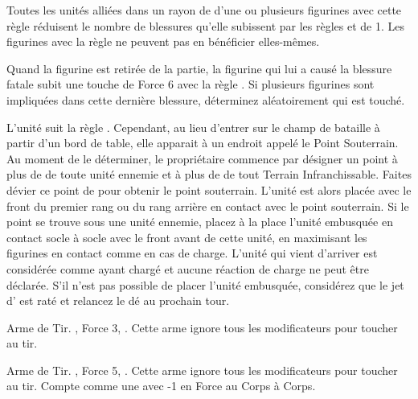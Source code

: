 Toutes les unités alliées dans un rayon de  d'une ou plusieurs figurines avec cette règle réduisent le nombre de blessures qu'elle subissent par les règles \dusttodust{} et \unstable{} de 1. Les figurines avec la règle \necromanticaura{} ne peuvent pas en bénéficier elles-mêmes.

\armyspecialruleentry{\mummyscurse{}}

Quand la figurine est retirée de la partie, la figurine qui lui a causé la blessure fatale subit une touche de Force 6 avec la règle . Si plusieurs figurines sont impliquées dans cette dernière blessure, déterminez aléatoirement qui est touché.

\armyspecialruleentry{\undergroundambush{}}

L'unité suit la règle \ambush{}. Cependant, au lieu d'entrer sur le champ de bataille à partir d'un bord de table, elle apparait à un endroit appelé le Point Souterrain. Au moment de le déterminer, le propriétaire commence par désigner un point à plus de  de toute unité ennemie et à plus de  de tout Terrain Infranchissable. Faites dévier ce point de  pour obtenir le point souterrain. L'unité est alors placée avec le front du premier rang ou du rang arrière en contact avec le point souterrain. Si le point se trouve sous une unité ennemie, placez à la place l'unité embusquée en contact socle à socle avec le front avant de cette unité, en maximisant les figurines en contact comme en cas de charge. L'unité qui vient d'arriver est considérée comme ayant chargé et aucune réaction de charge ne peut être déclarée. S'il n'est pas possible de placer l'unité embusquée, considérez que le jet d'\ambush{} est raté et relancez le dé au prochain tour.

\closearmyspecialrules









\vspace*{1.5cm}
\startarmyarmoury

\startitemlistonecol

\listitemonecol{\aspenbow} Arme de Tir. , Force 3, \volleyfire{}. Cette arme ignore tous les modificateurs pour toucher au tir.

\listitemonecol{\greataspenbow} Arme de Tir. , Force 5, \volleyfire{}. Cette arme ignore tous les modificateurs pour toucher au tir. Compte comme une \hw{} avec -1 en Force au Corps à Corps.

